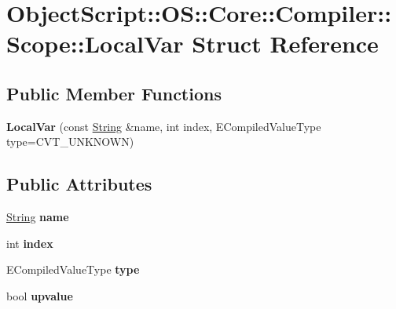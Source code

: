 \hypertarget{struct_object_script_1_1_o_s_1_1_core_1_1_compiler_1_1_scope_1_1_local_var}{}\section{Object\+Script\+:\+:OS\+:\+:Core\+:\+:Compiler\+:\+:Scope\+:\+:Local\+Var Struct Reference}
\label{struct_object_script_1_1_o_s_1_1_core_1_1_compiler_1_1_scope_1_1_local_var}
\subsection*{Public Member Functions}
\begin{DoxyCompactItemize}
\item 
{\bfseries Local\+Var} (const \hyperlink{class_object_script_1_1_o_s_1_1_core_1_1_string}{String} \&name, int index, E\+Compiled\+Value\+Type type=C\+V\+T\+\_\+\+U\+N\+K\+N\+O\+WN)\hypertarget{struct_object_script_1_1_o_s_1_1_core_1_1_compiler_1_1_scope_1_1_local_var_a5af6ac8b92a5a5ce00f487c6d5000745}{}\label{struct_object_script_1_1_o_s_1_1_core_1_1_compiler_1_1_scope_1_1_local_var_a5af6ac8b92a5a5ce00f487c6d5000745}

\end{DoxyCompactItemize}
\subsection*{Public Attributes}
\begin{DoxyCompactItemize}
\item 
\hyperlink{class_object_script_1_1_o_s_1_1_core_1_1_string}{String} {\bfseries name}\hypertarget{struct_object_script_1_1_o_s_1_1_core_1_1_compiler_1_1_scope_1_1_local_var_a93d37381c857a7692d8a2075a7846cfe}{}\label{struct_object_script_1_1_o_s_1_1_core_1_1_compiler_1_1_scope_1_1_local_var_a93d37381c857a7692d8a2075a7846cfe}

\item 
int {\bfseries index}\hypertarget{struct_object_script_1_1_o_s_1_1_core_1_1_compiler_1_1_scope_1_1_local_var_a7276317d654d3a7e64b27017a7b0992e}{}\label{struct_object_script_1_1_o_s_1_1_core_1_1_compiler_1_1_scope_1_1_local_var_a7276317d654d3a7e64b27017a7b0992e}

\item 
E\+Compiled\+Value\+Type {\bfseries type}\hypertarget{struct_object_script_1_1_o_s_1_1_core_1_1_compiler_1_1_scope_1_1_local_var_aa19e6ffea295c3c8d549727b039f3e52}{}\label{struct_object_script_1_1_o_s_1_1_core_1_1_compiler_1_1_scope_1_1_local_var_aa19e6ffea295c3c8d549727b039f3e52}

\item 
bool {\bfseries upvalue}\hypertarget{struct_object_script_1_1_o_s_1_1_core_1_1_compiler_1_1_scope_1_1_local_var_a65856460b9cd562cf62b071cfda64d34}{}\label{struct_object_script_1_1_o_s_1_1_core_1_1_compiler_1_1_scope_1_1_local_var_a65856460b9cd562cf62b071cfda64d34}

\end{DoxyCompactItemize}


